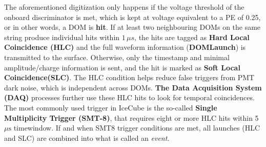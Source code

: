 The aforementioned digitization only happens if the voltage threshold of the onboard discriminator is met, which is kept at voltage equivalent to a PE of 0.25, or in other words, a DOM is \textbf{hit}. If at least two neighbouring DOMs on the same string produce individual hits within $1\,\mu s$, the hits are tagged as \textbf{Hard Local Coincidence (HLC)}  and the full waveform information (\textbf{DOMLaunch}) is transmitted to the surface. Otherwise, only the timestamp and minimal amplitude/charge information is sent, and the hit is marked as \textbf{Soft Local Coincidence(SLC)}. The HLC condition helps reduce false triggers from PMT dark noise, which is independent across DOMs. \textbf{The Data Acquisition System (DAQ)} processes further use these HLC hits to look for temporal coincidences. The most commonly used trigger in IceCube is the so-called \textbf{Single Multiplicity Trigger (SMT-8)}, that requires eight or more HLC hits within 5 $\mu\mathrm{s}$ timewindow. If and when SMT8 trigger conditions are met, all launches (HLC and SLC) are combined into what is called an \emph{event}. 
